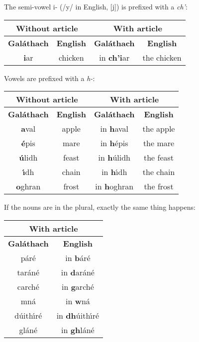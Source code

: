The semi-vowel i- (/y/ in English, $[$j$]$) is prefixed with a \textit{ch'}:
\begin{table}[H]
\centering
\begin{tabular}{c|c|c|c}
  \multicolumn{2}{c|}{\textbf{Without article}} & \multicolumn{2}{c}{\textbf{With article}}\\
  \toprule
  \textbf{Gal\'{a}thach} & \textbf{English} & \textbf{Gal\'{a}thach} & \textbf{English}\\
  \toprule
  \textbf{i}ar & chicken & in \textbf{ch'i}ar & the chicken
\end{tabular}
\label{examples_article_semi_vowel_i}
\end{table}

Vowels are prefixed with a \textit{h-}:
\begin{table}[H]
\centering
\begin{tabular}{c|c|c|c}
  \multicolumn{2}{c|}{\textbf{Without article}} & \multicolumn{2}{c}{\textbf{With article}}\\
  \toprule
  \textbf{Gal\'{a}thach} & \textbf{English} & \textbf{Gal\'{a}thach} & \textbf{English}\\
  \toprule
  \textbf{a}val & apple & in \textbf{h}aval & the apple\\
  \textbf{\'{e}}pis & mare & in \textbf{h}\'{e}pis & the mare\\
  \textbf{\'{u}}lidh & feast & in \textbf{h}\'{u}lidh & the feast\\
  \textbf{\'{\i}}dh & chain & in \textbf{h}\'{\i}dh & the chain\\
  \textbf{o}ghran & frost & in \textbf{h}oghran & the frost
\end{tabular}
\label{examples_article_prefix_h}
\end{table}

If the nouns are in the plural, exactly the same thing happens:
\begin{table}[H]
\centering
\begin{tabular}{c|c}
  \multicolumn{2}{c}{\textbf{With article}}\\
  \toprule
  \textbf{Gal\'{a}thach} & \textbf{English}\\
  \toprule
  p\'{a}r\'{e} & in \textbf{b}\'{a}r\'{e}\\
  tar\'{a}n\'{e} & in \textbf{d}ar\'{a}n\'{e}\\
  carch\'{e} & in \textbf{g}arch\'{e}\\
  mn\'{a} & in \textbf{w}n\'{a}\\
  d\'{u}ith\'{\i}r\'{e} & in \textbf{dh}\'{u}ith\'{\i}r\'{e}\\
  gl\'{a}n\'{e} & in \textbf{gh}l\'{a}n\'{e}
\end{tabular}
\label{examples_fix_h}
\end{table}

